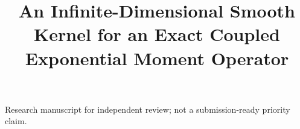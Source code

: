 \documentclass[11pt,a4paper]{article}
\title{An Infinite-Dimensional Smooth Kernel for an Exact Coupled Exponential Moment Operator}
\author{} %
\date{}
\numberwithin{equation}{section}
\theoremstyle{definition}
\begin{document}
\maketitle
\begin{center}\small
Research manuscript for independent review; not a submission-ready priority claim.
\end{center}









\end{document}
